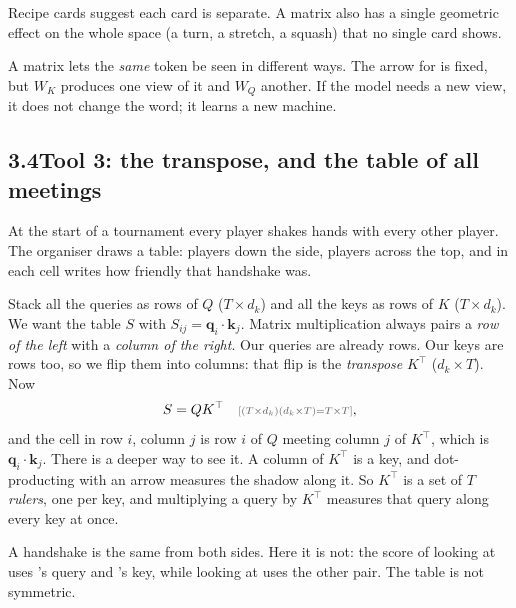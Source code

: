 \begin{breaks}
Recipe cards suggest each card is separate. A matrix also has a single geometric effect on the whole space (a
turn, a stretch, a squash) that no single card shows.
\end{breaks}

\Why A matrix lets the \emph{same} token be seen in different ways. The arrow for  is fixed, but $W_K$
produces one view of it and $W_Q$ another. If the model needs a new view, it does not change the word; it learns
a new machine.


\subsection*{3.4\quad Tool 3: the transpose, and the table of all meetings}

\Picture At the start of a tournament every player shakes hands with every other player. The organiser draws a
table: players down the side, players across the top, and in each cell writes how friendly that handshake was.

\Exactly Stack all the queries as rows of $Q$ ($T\times d_k$) and all the keys as rows of $K$ ($T\times d_k$). We
want the table $S$ with $S_{ij} = \bm{q}_i\cdot\bm{k}_j$. Matrix multiplication always pairs a \emph{row of the
left} with a \emph{column of the right}. Our queries are already rows. Our keys are rows too, so we flip them into
columns: that flip is the \emph{transpose} $K^\top$ ($d_k\times T$). Now
\[
S = Q K^\top \shape{(T\times d_k)(d_k\times T) = T\times T},
\]
and the cell in row $i$, column $j$ is row $i$ of $Q$ meeting column $j$ of $K^\top$, which is
$\bm{q}_i\cdot\bm{k}_j$. There is a deeper way to see it. A column of $K^\top$ is a key, and dot-producting with
an arrow measures the shadow along it. So $K^\top$ is a set of $T$ \emph{rulers}, one per key, and multiplying a
query by $K^\top$ measures that query along every key at once.

\begin{breaks}
A handshake is the same from both sides. Here it is not: the score of  looking at  uses
's query and 's key, while  looking at  uses the other pair. The table is
not symmetric.
\end{breaks}

